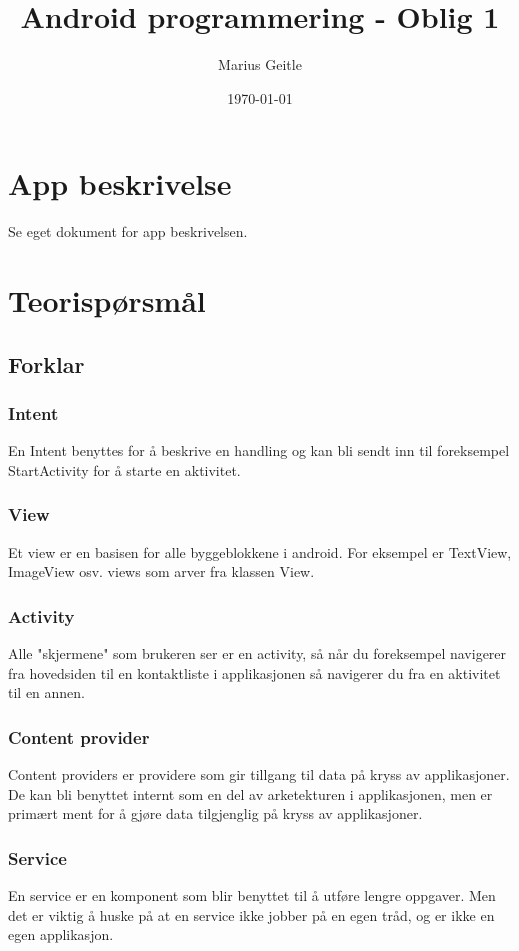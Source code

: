 \documentclass[a4paper, 12pt]{article}
\begin{document}
\title{Android programmering - Oblig 1}
\date{\today}
\author{Marius Geitle}

\maketitle

\section{App beskrivelse}

Se eget dokument for app beskrivelsen.

\section{Teorispørsmål}
\subsection*{Forklar}
\subsubsection*{Intent}
En Intent benyttes for å beskrive en handling og kan bli sendt inn til foreksempel StartActivity for å starte en aktivitet.

\subsubsection*{View}
Et view er en basisen for alle byggeblokkene i android. For eksempel er TextView, ImageView osv. views som arver fra klassen View.

\subsubsection*{Activity}
Alle "skjermene" som brukeren ser er en activity, så når du foreksempel navigerer fra hovedsiden til en kontaktliste i applikasjonen så navigerer du fra en aktivitet til en annen.

\subsubsection*{Content provider}
Content providers er providere som gir tillgang til data på kryss av applikasjoner. De kan bli benyttet internt som en del av arketekturen i applikasjonen, men er primært ment for å gjøre data tilgjenglig på kryss av applikasjoner.

\subsubsection*{Service}
En service er en komponent som blir benyttet til å utføre lengre oppgaver. Men det er viktig å huske på at en service ikke jobber på en egen tråd, og er ikke en egen applikasjon.
\end{document}
